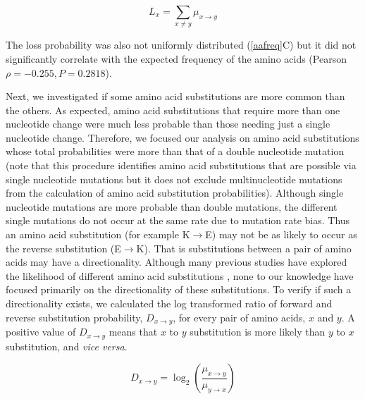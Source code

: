\documentclass[12pt,a4paper]{article}
\begin{document}
\begin{equation}
L_x = \sum_{x \neq y} \mu_{x\to y}
\label{aalosseq}
\end{equation}


The loss probability was also not uniformly distributed (\autoref{aafreq}{\color{blue}C}) but it did not significantly correlate with the expected frequency of the amino acids (Pearson $\rho = -0.255, P = 0.2818$).

Next, we investigated if some amino acid substitutions are more common than the others. As expected, amino acid substitutions that require more than one nucleotide change were much less probable than those needing just a single nucleotide change. Therefore, we focused our analysis on amino acid substitutions whose total probabilities were more than that of a double nucleotide mutation (note that this procedure identifies amino acid substitutions that are possible via single nucleotide mutations but it does not exclude multinucleotide mutations from the calculation of amino acid substitution probabilities). Although single nucleotide mutations are more probable than double mutations, the different single mutations do not occur at the same rate due to mutation rate bias. Thus an amino acid substitution (for example K$\to$E) may not be as likely to occur as the reverse substitution (E$\to$K). That is substitutions between a pair of amino acids may have a directionality. Although many previous studies have explored the likelihood of different amino acid substitutions \citep{aasubOhta,PAM,blosum,submat92,submat92j,submat01,submat05,submat07,submat08}, none to our knowledge have focused primarily on the directionality of these substitutions. To verify if such a directionality exists, we calculated the log transformed ratio of forward and reverse substitution probability, $D_{x\to y}$, for every pair of amino acids, $x$ and $y$. A positive value of $D_{x\to y}$ means that $x$ to $y$ substitution is more likely than $y$ to $x$ substitution, and \textit{vice versa}.

\begin{equation}
\textit{D}_{x\to y} = \log_2\left(\frac{\mu_{x\to y}}{\mu_{y\to x}}\right)
\label{directionality}
\end{equation}
\end{document}
